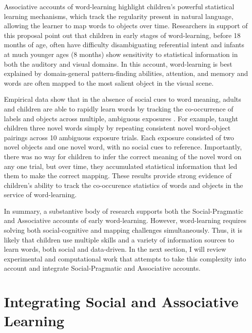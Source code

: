 \documentclass[man]{apa2}
\begin{document}
Associative accounts of word-learning highlight children's powerful statistical learning mechanisms, which track the regularity present in natural language, allowing the learner to map words to objects over time. Researchers in support of this proposal point out that children in early stages of word-learning, before 18 months of age, often have difficulty disambiguating referential intent and infants at much younger ages (8 months) show sensitivity to statistical information in both the auditory \cite{saffran1996statistical} and visual \cite{fiser2002statistical} domains. In this account, word-learning is best explained by domain-general pattern-finding abilities, attention, and memory and words are often mapped to the most salient object in the visual scene.

Empirical data show that in the absence of social cues to word meaning, adults and children are able to rapidly learn words by tracking the co-occurrence of labels and objects across multiple, ambiguous exposures \cite{smith2008infants,vouloumanos2008fine}. For example,  taught children three novel words simply by repeating consistent novel word-object pairings across 10 ambiguous exposure trials. Each exposure consisted of two novel objects and one novel word, with no social cues to reference. Importantly, there was no way for children to infer the correct meaning of the novel word on any one trial, but over time, they accumulated statistical information that led them to make the correct mapping. These results provide strong evidence of children's ability to track the co-occurence statistics of words and objects in the service of word-learning. 

In summary, a substantive body of research supports both the Social-Pragmatic and Associative accounts of early word-learning. However, word-learning requires solving both social-cognitive and mapping challenges simultaneously. Thus, it is likely that children use multiple skills and a variety of information sources to learn words, both social and data-driven. In the next section, I will review experimental and computational work that attempts to take this complexity into account and integrate Social-Pragmatic and Associative accounts. 


\section{Integrating Social and Associative Learning}
\end{document}
